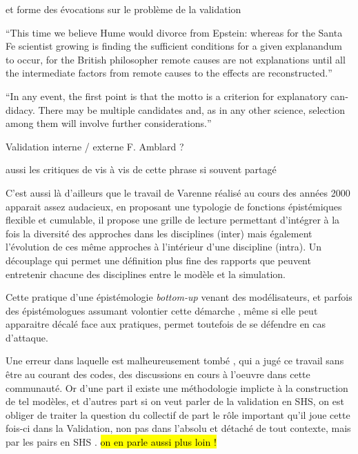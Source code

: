  et forme des évocations sur le problème de la validation


\foreignquote{english}{This time we believe Hume would divorce from Epstein: whereas for the Santa Fe scientist growing is finding the sufficient conditions for a given explanandum to occur, for the British philosopher remote causes are not explanations until all the intermediate factors from remote causes to the effects are reconstructed.} \autocite{Conte2007}

\foreignquote{english}{In any event, the first point is that the motto is a criterion for explanatory candidacy. There may be multiple candidates and, as in any other science, selection among them will involve further considerations.} \textcite{Epstein2006}


Validation interne / externe F. Amblard ? 


aussi les critiques de \textcite{Conte2007} vis à vis de cette phrase si souvent partagé


C'est aussi là d'ailleurs que le travail de Varenne réalisé au cours des années 2000 \autocites{Varenne2008, Varenne2013} apparait assez audacieux, en proposant une typologie de fonctions épistémiques flexible et cumulable, il propose une grille de lecture permettant d'intégrer à la fois la diversité des approches dans les disciplines (inter) mais également l'évolution de ces même approches à l'intérieur d'une discipline (intra). Un découplage qui permet une définition plus fine des rapports que peuvent entretenir chacune des disciplines entre le modèle et la simulation.


Cette pratique d'une épistémologie \textit{bottom-up} venant des modélisateurs, et parfois des épistémologues assumant volontier cette démarche \autocite{Varenne2014}, même si elle peut apparaitre décalé face aux pratiques, permet toutefois de se défendre en cas d'attaque.

Une erreur dans laquelle est malheureusement tombé \textcite{Yanoff2008}, qui a jugé ce travail sans être au courant des codes, des discussions en cours à l'oeuvre dans cette communauté. Or d'une part il existe une méthodologie implicte à la construction de tel modèles, et d'autres part si on veut parler de la validation en SHS, on est obliger de traiter la question du collectif de part le rôle important qu'il joue cette fois-ci dans la Validation, non pas dans l'absolu et détaché de tout contexte, mais par les pairs en SHS \autocite{Rouchier2013, Ahrweiler2005}. \hl{on en parle aussi plus loin ! } \autocite{}

